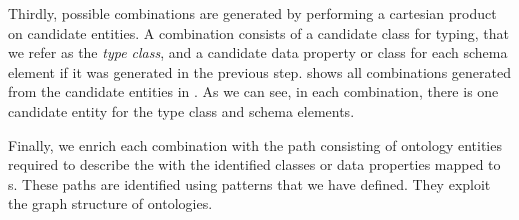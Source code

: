 Thirdly, possible combinations are generated by performing a cartesian product on candidate entities. A combination consists of a candidate class for typing, that we refer as the \emph{type class}, and a candidate data property or class for each schema element if it was generated in the previous step.  shows all combinations generated from the candidate entities in . As we can see, in each combination, there is one candidate entity for the type class and schema elements.

\begin{table}[]
	\centering
	\caption{Combinations of generated entities for type class and schema elements}
	\label{tab:overviewCombinationsElements}
\end{table}

Finally, we enrich each combination with the path consisting of ontology entities required to describe the  with the identified classes or data properties mapped to s. These paths are identified using patterns that we have defined. They exploit the graph structure of ontologies. 


